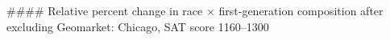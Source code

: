 #### Relative percent change in race × first-generation composition after excluding Geomarket: Chicago, SAT score 1160–1300
